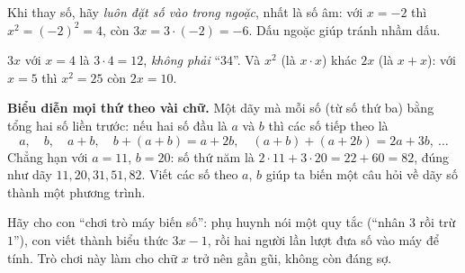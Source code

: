 \documentclass[11pt]{article}
\newenvironment{figC}{\par\vspace{2pt}\begin{center}\begin{tikzpicture}[font=\sffamily\small,>=stealth,line join=round]}%
  {\end{tikzpicture}\end{center}\vspace{1pt}}
\begin{document}

\begin{tipbox}
Khi thay số, hãy \emph{luôn đặt số vào trong ngoặc}, nhất là số âm: với $x=-2$ thì
$x^2=(-2)^2=4$, còn $3x=3\cdot(-2)=-6$. Dấu ngoặc giúp tránh nhầm dấu.
\end{tipbox}

\begin{warnbox}
$3x$ với $x=4$ là $3\cdot 4=12$, \emph{không phải} ``$34$''. Và $x^2$ (là $x\cdot x$) khác $2x$ (là $x+x$):
với $x=5$ thì $x^2=25$ còn $2x=10$.
\end{warnbox}

\begin{tipbox}
\textbf{Biểu diễn mọi thứ theo vài chữ.} Một dãy mà mỗi số (từ số thứ ba) bằng tổng hai số liền trước:
nếu hai số đầu là $a$ và $b$ thì các số tiếp theo là
\[a,\quad b,\quad a+b,\quad b+(a+b)=a+2b,\quad (a+b)+(a+2b)=2a+3b,\ \dots\]
Chẳng hạn với $a=11$, $b=20$: số thứ năm là $2\cdot 11+3\cdot 20=22+60=82$, đúng như dãy $11,20,31,51,82$.
Viết các số theo $a$, $b$ giúp ta biến một câu hỏi về dãy số thành một phương trình.
\end{tipbox}

\begin{parentbox}
Hãy cho con ``chơi trò máy biến số'': phụ huynh nói một quy tắc (``nhân $3$ rồi trừ $1$''),
con viết thành biểu thức $3x-1$, rồi hai người lần lượt đưa số vào máy để tính. Trò chơi này làm
cho chữ $x$ trở nên gần gũi, không còn đáng sợ.
\end{parentbox}
\end{document}
